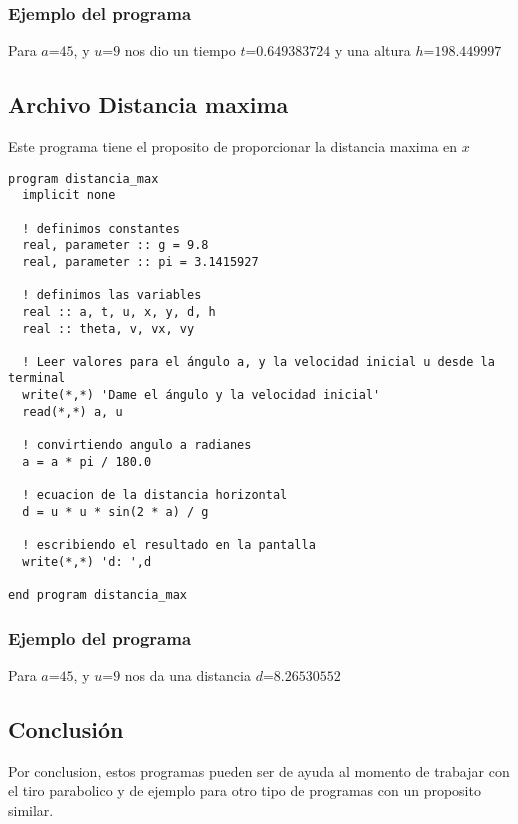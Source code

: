 \documentclass{article}
\begin{document}
\subsubsection{Ejemplo del programa}
Para $a$=$45$, y $u$=$9$ nos dio un tiempo $t$=$0.649383724 $ y una altura $h$=$198.449997$
\subsection{Archivo Distancia maxima}
Este programa tiene el proposito de proporcionar la distancia maxima en $x$
\begin{verbatim}
program distancia_max
  implicit none

  ! definimos constantes
  real, parameter :: g = 9.8
  real, parameter :: pi = 3.1415927

  ! definimos las variables
  real :: a, t, u, x, y, d, h
  real :: theta, v, vx, vy

  ! Leer valores para el ángulo a, y la velocidad inicial u desde la terminal
  write(*,*) 'Dame el ángulo y la velocidad inicial'
  read(*,*) a, u

  ! convirtiendo angulo a radianes
  a = a * pi / 180.0

  ! ecuacion de la distancia horizontal
  d = u * u * sin(2 * a) / g

  ! escribiendo el resultado en la pantalla
  write(*,*) 'd: ',d

end program distancia_max
\end{verbatim}
\subsubsection{Ejemplo del programa}
Para $a$=$45$, y $u$=$9$ nos da una distancia $d$=$8.26530552$
\subsection{Conclusión}
Por conclusion, estos programas pueden ser de ayuda al momento de trabajar con el tiro parabolico y de ejemplo para otro tipo de programas con un proposito similar.
\end{document}
